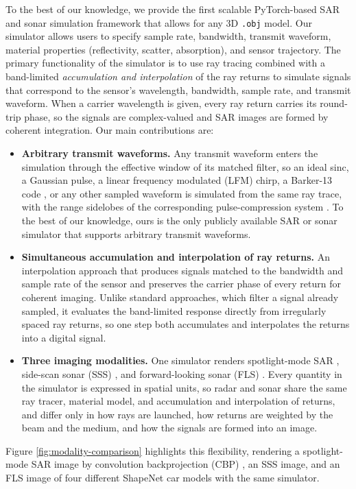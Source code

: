 \documentclass[sensors,article,submit,moreauthors]{Definitions/mdpi}
\begin{document}
To the best of our knowledge, we provide the first scalable PyTorch-based SAR
and sonar simulation framework that allows for any 3D \texttt{.obj} model. Our
simulator allows users to specify sample rate, bandwidth, transmit waveform,
material properties (reflectivity, scatter, absorption), and sensor trajectory.
The primary functionality of the simulator is to use ray tracing combined with a
band-limited \emph{accumulation and interpolation} of the ray returns to
simulate signals that correspond to the sensor's wavelength, bandwidth, sample
rate, and transmit waveform. When a carrier wavelength is given, every ray
return carries its round-trip phase, so the signals are complex-valued and SAR
images are formed by coherent integration. Our main contributions are:
\begin{itemize}
    \item \textbf{Arbitrary transmit waveforms.} Any transmit waveform enters
    the simulation through the effective window of its matched filter, so an
    ideal sinc, a Gaussian pulse, a linear frequency modulated (LFM) chirp, a
    Barker-13 code \cite{barker1953group}, or any other
    sampled waveform is simulated from the same ray trace, with the range
    sidelobes of the corresponding pulse-compression system
    \cite{levanon2004radar}. To the best of our
    knowledge, ours is the only publicly available SAR or sonar simulator that
    supports arbitrary transmit waveforms.
    \item \textbf{Simultaneous accumulation and interpolation of ray returns.} 
    An interpolation approach that produces signals matched to the bandwidth and sample
    rate of the sensor and preserves the carrier phase of every return for
    coherent imaging. Unlike standard approaches, which filter a signal
    already sampled, it evaluates the band-limited response
    directly from irregularly spaced ray returns, so one step both accumulates and
    interpolates the returns into a digital signal.
    \item \textbf{Three imaging modalities.} One simulator renders spotlight-mode
    SAR \cite{spotlightmodesar}, side-scan sonar (SSS) \cite{blondel2009sidescan},
    and forward-looking sonar (FLS) \cite{hurtos2015fls}. Every quantity in the simulator is expressed in spatial units,
    so radar and sonar share the same ray tracer, material model, and
    accumulation and interpolation of returns, and differ only in how rays are
    launched, how returns are weighted by the beam and the medium, and how the
    signals are formed into an image.
\end{itemize}
Figure \ref{fig:modality-comparison} highlights this flexibility, rendering a
spotlight-mode SAR image by convolution backprojection (CBP)
\cite{desai1992cbp}, an SSS image, and
an FLS image of four different ShapeNet car models with the same simulator.
\end{document}
